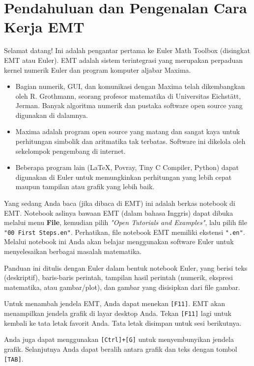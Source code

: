 \documentclass[11pt, a4paper]{article}
\begin{document}
\section*{Pendahuluan dan Pengenalan Cara Kerja EMT}

Selamat datang! Ini adalah pengantar pertama ke Euler Math Toolbox (disingkat EMT atau Euler). EMT adalah sistem terintegrasi yang merupakan perpaduan kernel numerik Euler dan program komputer aljabar Maxima.

\begin{itemize}
    \item Bagian numerik, GUI, dan komunikasi dengan Maxima telah dikembangkan oleh R. Grothmann, seorang profesor matematika di Universitas Eichst\"att, Jerman. Banyak algoritma numerik dan pustaka software open source yang digunakan di dalamnya.
    \item Maxima adalah program open source yang matang dan sangat kaya untuk perhitungan simbolik dan aritmatika tak terbatas. Software ini dikelola oleh sekelompok pengembang di internet.
    \item Beberapa program lain (LaTeX, Povray, Tiny C Compiler, Python) dapat digunakan di Euler untuk memungkinkan perhitungan yang lebih cepat maupun tampilan atau grafik yang lebih baik.
\end{itemize}

Yang sedang Anda baca (jika dibaca di EMT) ini adalah berkas notebook di EMT. Notebook aslinya bawaan EMT (dalam bahasa Inggris) dapat dibuka melalui menu \textbf{File}, kemudian pilih \textit{"Open Tutorials and Examples"}, lalu pilih file \texttt{"00 First Steps.en"}. Perhatikan, file notebook EMT memiliki ekstensi \texttt{".en"}. Melalui notebook ini Anda akan belajar menggunakan software Euler untuk menyelesaikan berbagai masalah matematika.

Panduan ini ditulis dengan Euler dalam bentuk notebook Euler, yang berisi teks (deskriptif), baris-baris perintah, tampilan hasil perintah (numerik, ekspresi matematika, atau gambar/plot), dan gambar yang disisipkan dari file gambar.

Untuk menambah jendela EMT, Anda dapat menekan \texttt{[F11]}. EMT akan menampilkan jendela grafik di layar desktop Anda. Tekan \texttt{[F11]} lagi untuk kembali ke tata letak favorit Anda. Tata letak disimpan untuk sesi berikutnya.

Anda juga dapat menggunakan \texttt{[Ctrl]+[G]} untuk menyembunyikan jendela grafik. Selanjutnya Anda dapat beralih antara grafik dan teks dengan tombol \texttt{[TAB]}.
\end{document}
